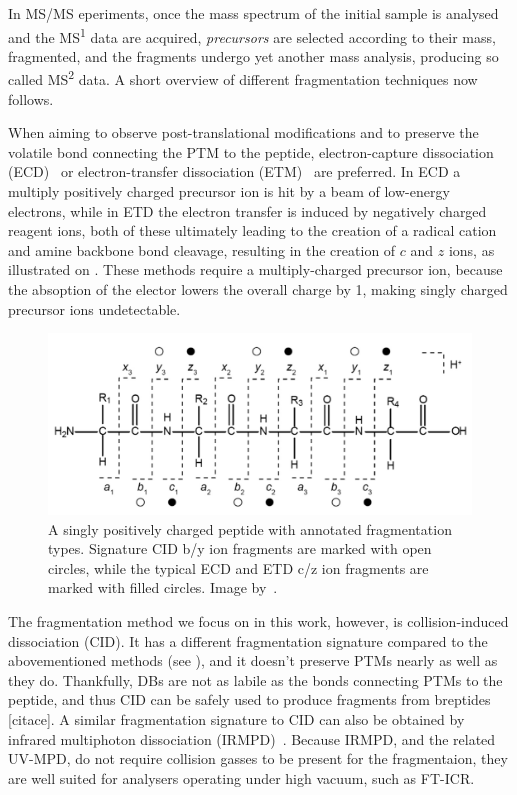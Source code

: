 In MS/MS eperiments, once the mass spectrum of the initial sample is analysed and the MS\textsuperscript{1} data are acquired, \emph{precursors} are selected according to their mass, fragmented, and the fragments undergo yet another mass analysis, producing so called MS\textsuperscript{2} data. A short overview of different fragmentation techniques now follows.

When aiming to observe post-translational modifications and to preserve the volatile bond connecting the PTM to the peptide, electron-capture dissociation (ECD)~\cite{zubarev2000electron} or electron-transfer dissociation (ETM)~\cite{syka2004peptide} are preferred. In ECD a multiply positively charged precursor ion is hit by a beam of low-energy electrons, while in ETD the electron transfer is induced by negatively charged reagent ions, both of these ultimately leading to the creation of a radical cation and amine backbone bond cleavage, resulting in the creation of \(c\) and \(z\) ions, as illustrated on . These methods require a multiply-charged precursor ion, because the absoption of the elector lowers the overall charge by 1, making singly charged precursor ions undetectable.

\begin{figure}
  \centering
  \includegraphics[width=.75\linewidth]{img/fragment-types.png}
  \caption{A singly positively charged peptide with annotated fragmentation types. Signature CID b/y ion fragments are marked with open circles, while the typical ECD and ETD c/z ion fragments are marked with filled circles. Image by~\citet{hart2014review}.}\label{fig:fragment-types}
\end{figure}

The fragmentation method we focus on in this work, however, is collision-induced dissociation (CID). It has a different fragmentation signature compared to the abovementioned methods (see ), and it doesn't preserve PTMs nearly as well as they do. Thankfully, DBs are not as labile as the bonds connecting PTMs to the peptide, and thus CID can be safely used to produce fragments from breptides [citace]. A similar fragmentation signature to CID can also be obtained by infrared multiphoton dissociation (IRMPD)~\cite{oomens2006gas}. Because IRMPD, and the related UV-MPD, do not require collision gasses to be present for the fragmentaion, they are well suited for analysers operating under high vacuum, such as FT-ICR\@.

